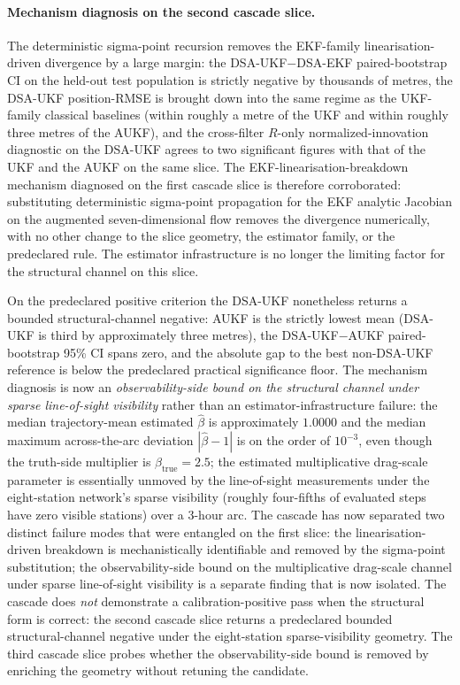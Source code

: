 \documentclass{article}
\begin{document}
\paragraph{Mechanism diagnosis on the second cascade slice.}
The deterministic sigma-point recursion removes the EKF-family linearisation-driven divergence by a large margin: the DSA-UKF$-$DSA-EKF paired-bootstrap CI on the held-out test population is strictly negative by thousands of metres, the DSA-UKF position-RMSE is brought down into the same regime as the UKF-family classical baselines (within roughly a metre of the UKF and within roughly three metres of the AUKF), and the cross-filter $R$-only normalized-innovation diagnostic on the DSA-UKF agrees to two significant figures with that of the UKF and the AUKF on the same slice. The EKF-linearisation-breakdown mechanism diagnosed on the first cascade slice is therefore corroborated: substituting deterministic sigma-point propagation for the EKF analytic Jacobian on the augmented seven-dimensional flow removes the divergence numerically, with no other change to the slice geometry, the estimator family, or the predeclared rule. The estimator infrastructure is no longer the limiting factor for the structural channel on this slice.

On the predeclared positive criterion the DSA-UKF nonetheless returns a bounded structural-channel negative: AUKF is the strictly lowest mean (DSA-UKF is third by approximately three metres), the DSA-UKF$-$AUKF paired-bootstrap 95\% CI spans zero, and the absolute gap to the best non-DSA-UKF reference is below the predeclared practical significance floor. The mechanism diagnosis is now an \emph{observability-side bound on the structural channel under sparse line-of-sight visibility} rather than an estimator-infrastructure failure: the median trajectory-mean estimated $\hat{\beta}$ is approximately $1.0000$ and the median maximum across-the-arc deviation $|\hat{\beta}-1|$ is on the order of $10^{-3}$, even though the truth-side multiplier is $\beta_{\mathrm{true}}=2.5$; the estimated multiplicative drag-scale parameter is essentially unmoved by the line-of-sight measurements under the eight-station network's sparse visibility (roughly four-fifths of evaluated steps have zero visible stations) over a 3-hour arc. The cascade has now separated two distinct failure modes that were entangled on the first slice: the linearisation-driven breakdown is mechanistically identifiable and removed by the sigma-point substitution; the observability-side bound on the multiplicative drag-scale channel under sparse line-of-sight visibility is a separate finding that is now isolated. The cascade does \emph{not} demonstrate a calibration-positive pass when the structural form is correct: the second cascade slice returns a predeclared bounded structural-channel negative under the eight-station sparse-visibility geometry. The third cascade slice probes whether the observability-side bound is removed by enriching the geometry without retuning the candidate.
\end{document}
